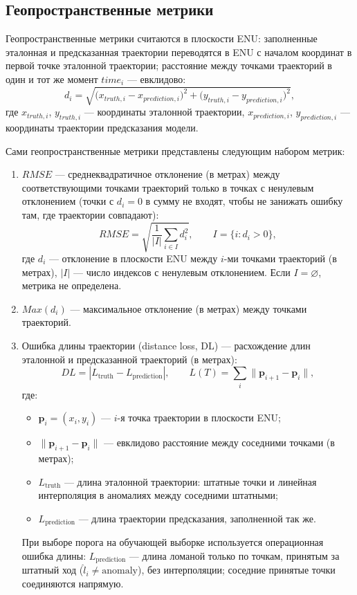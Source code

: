 \documentclass[a4paper,12pt]{report}
\begin{document}
	\subsection{Геопространственные метрики}
	Геопространственные метрики считаются в плоскости ENU: заполненные эталонная и предсказанная траектории переводятся в ENU с началом координат в первой точке эталонной траектории; расстояние между точками траекторий в один и тот же момент $time_i$ --- евклидово:
	\[
	d_i = \sqrt{\bigl(x_{truth,i}-x_{prediction,i}\bigr)^2+\bigl(y_{truth,i}-y_{prediction,i}\bigr)^2},
	\]
	где $x_{truth,i}$, $y_{truth,i}$ --- координаты эталонной траектории, $x_{prediction,i}$, $y_{prediction,i}$ --- координаты траектории предсказания модели.

	Сами геопространственные метрики представлены следующим набором метрик:
	\begin{enumerate}
		\item $RMSE$ --- среднеквадратичное отклонение (в метрах) между соответствующими точками траекторий только в точках с ненулевым отклонением (точки с $d_i = 0$ в сумму не входят, чтобы не занижать ошибку там, где траектории совпадают):
		\[
		RMSE=\sqrt{\frac{1}{|I|}\sum_{i\in I} d_i^2}, \qquad I=\{i : d_i > 0\},
		\]
		где $d_i$ --- отклонение в плоскости ENU между $i$-ми точками траекторий (в метрах), $|I|$ --- число индексов с ненулевым отклонением. Если $I=\varnothing$, метрика не определена.
		\item $Max(d_i)$ --- максимальное отклонение (в метрах) между точками траекторий.
		\item Ошибка длины траектории (distance loss, DL) --- расхождение длин эталонной и предсказанной траекторий (в метрах):
		\[
		DL=|L_{\mathrm{truth}}-L_{\mathrm{prediction}}|,  \qquad L(T)=\sum_i \lVert\mathbf p_{i+1}-\mathbf p_i\rVert,
		\]
		где:
		\begin{itemize}
			\item $\mathbf p_i=(x_i,y_i)$ --- $i$-я точка траектории в плоскости ENU;
			\item $\lVert\mathbf p_{i+1}-\mathbf p_i\rVert$ --- евклидово расстояние между соседними точками (в метрах);
			\item $L_{\mathrm{truth}}$ --- длина эталонной траектории: штатные точки и линейная интерполяция в аномалиях между соседними штатными;
			\item $L_{\mathrm{prediction}}$ --- длина траектории предсказания, заполненной так же.
		\end{itemize}
		При выборе порога на обучающей выборке используется операционная ошибка длины: $L_{\mathrm{prediction}}$ --- длина ломаной только по точкам, принятым за штатный ход ($\hat l_i \neq \mathrm{anomaly}$), без интерполяции; соседние принятые точки соединяются напрямую.
	\end{enumerate}
\end{document}
